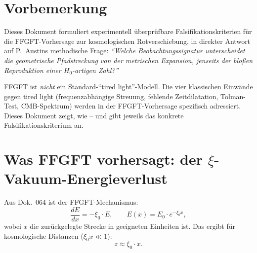 
\section*{Vorbemerkung}

Dieses Dokument formuliert experimentell überprüfbare
Falsifikationskriterien für die FFGFT-Vorhersage zur kosmologischen
Rotverschiebung, in direkter Antwort auf P.~Austins methodische Frage:
\emph{\enquote{Welche Beobachtungssignatur unterscheidet die geometrische
Pfadstreckung von der metrischen Expansion, jenseits der bloßen
Reproduktion einer $H_0$-artigen Zahl?}}

FFGFT ist \emph{nicht} ein Standard-\enquote{tired light}-Modell. Die
vier klassischen Einwände gegen tired light (frequenzabhängige
Streuung, fehlende Zeitdilatation, Tolman-Test, CMB-Spektrum) werden
in der FFGFT-Vorhersage spezifisch adressiert. Dieses Dokument zeigt,
wie -- und gibt jeweils das konkrete Falsifikationskriterium an.

\section{\texorpdfstring{Was FFGFT vorhersagt: der $\xi$-Vakuum-Energieverlust}{Was FFGFT vorhersagt: der xi-Vakuum-Energieverlust}}

Aus Dok.~064 ist der FFGFT-Mechanismus:
\begin{equation}
  \frac{dE}{dx} = -\xi_0 \cdot E,
  \qquad
  E(x) = E_0 \cdot e^{-\xi_0 x},
  \label{eq:energieverlust}
\end{equation}
wobei $x$ die zurückgelegte Strecke in geeigneten Einheiten ist.
Das ergibt für kosmologische Distanzen ($\xi_0 x \ll 1$):
\begin{equation}
  z \approx \xi_0 \cdot x.
\end{equation}

